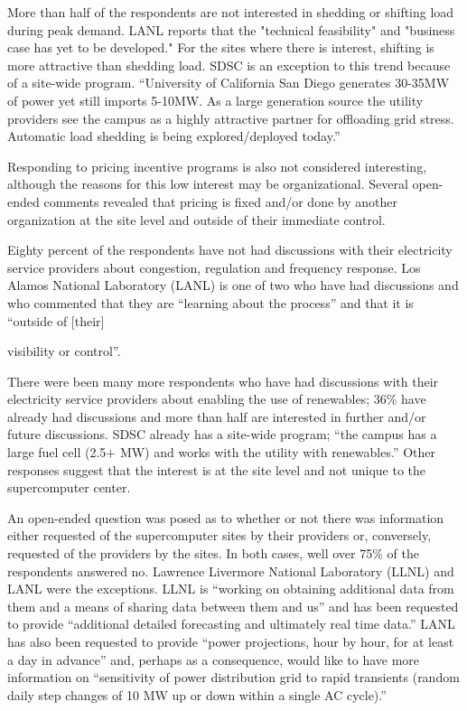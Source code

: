 More than half of the respondents are not interested in shedding or shifting
load during peak demand. LANL reports that the "technical feasibility" and "business case has yet to be developed."
For the sites where
there is interest, shifting is more attractive than shedding load. SDSC is
an exception to this trend because of a site-wide program. ``University of California San Diego
generates 30-35MW of power yet still imports 5-10MW. As a large generation
source the utility providers see the campus as a highly attractive partner
for offloading grid stress. Automatic load shedding is being
explored/deployed today.''

Responding to pricing incentive programs is also not considered interesting,
although the reasons for this low interest may be organizational. Several
open-ended comments revealed that pricing is fixed and/or done by another
organization at the site level and outside of their immediate control.

Eighty percent of the respondents have not had discussions with their
electricity service providers about congestion, regulation and frequency
response. Los Alamos National Laboratory (LANL) is one of two who have had discussions and who commented that
they are ``learning about the process'' and that it is ``outside of [their]

visibility or control''.

There were been many more respondents who have had discussions with their
electricity service providers about enabling the use of renewables; 36{\%}
have already had discussions and more than half are interested in further
and/or future discussions. SDSC already has a site-wide program; ``the
campus has a large fuel cell (2.5$+$ MW) and works with the utility with
renewables.'' Other responses suggest that the interest is at the site level
and not unique to the supercomputer center.

An open-ended question was posed as to whether or not there was information
either requested of the supercomputer sites by their providers or,
conversely, requested of the providers by the sites. In both cases, well
over 75{\%} of the respondents answered no. Lawrence Livermore National Laboratory (LLNL) and LANL were the
exceptions. LLNL is ``working on obtaining additional data from them and a
means of sharing data between them and us'' and has been requested to
provide ``additional detailed forecasting and ultimately real time data.''
LANL has also been requested to provide ``power projections, hour by hour,
for at least a day in advance'' and, perhaps as a consequence, would like to
have more information on ``sensitivity of power distribution grid to rapid
transients (random daily step changes of 10 MW up or down within a single AC
cycle).''

